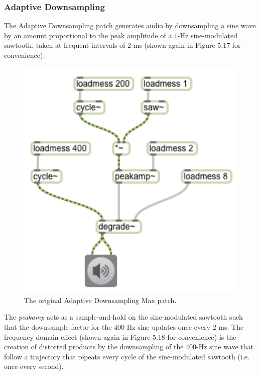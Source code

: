 \documentclass[12pt]{report} 	%
\numberwithin{figure}{chapter}
\numberwithin{table}{chapter}
\numberwithin{equation}{chapter}
\begin{document}
\begin{flushleft}
\clearpage
\subsubsection{Adaptive Downsampling}
The Adaptive Downsampling patch generates audio by downsampling a sine wave by an amount proportional to the peak amplitude of a $1$-Hz sine-modulated sawtooth, taken at frequent intervals of $2$ ms (shown again in Figure 5.17 for convenience).
\begin{figure}[h!]
\begin{center}
\includegraphics[scale=0.8]{AdaptiveDegrade}
\caption[Original adaptive downsampling Max patch]{The original Adaptive Downsampling Max patch.}
\end{center}
\end{figure}
The \textit{peakamp\texttildelow{}} acts as a sample-and-hold on the sine-modulated sawtooth such that the downsample factor for the $400$ Hz sine updates once every $2$ ms. The frequency domain effect (shown again in Figure 5.18 for convenience) is the creation of distorted products by the downsampling of the $400$-Hz sine wave that follow a trajectory that repeats every cycle of the sine-modulated sawtooth (i.e. once every second).
\begin{figure}[h!]
\begin{center}

\end{center}
\end{figure}
\end{flushleft}
\end{document}
